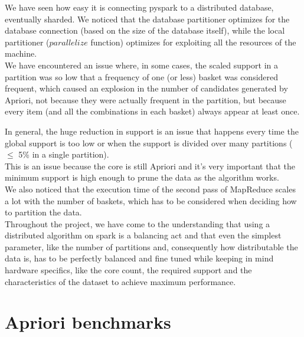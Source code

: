 \documentclass[a4paper]{article}
\begin{document}
	We have seen how easy it is connecting pyspark to a distributed database, eventually sharded.	
	We noticed that the database partitioner optimizes for the database connection (based on the size of the database itself), 
	while the local partitioner ($parallelize$ function) optimizes for exploiting all the resources of the machine.\\
	
	We have encountered an issue where, in some cases, the scaled support in a partition was so low that a frequency of one (or less) basket was considered frequent, 
	which caused an explosion in the number of candidates generated by Apriori, not because they were actually frequent in the partition, but 
	because every item (and all the combinations in each basket) always appear at least once. 

	In general, the huge reduction in support is an issue that happens every time the global support is too low or when the support is divided over many partitions ($\leq$ 5\% in a single partition).\\
	This is an issue because the core is still Apriori and it's very important that the minimum support is high enough to prune the data as the algorithm works.\\

	We also noticed that the execution time of the second pass of MapReduce scales a lot with the number of baskets, which has to be considered when deciding how to partition the data.\\

	Throughout the project, we have come to the understanding that using a distributed algorithm on spark is a balancing act and that even the simplest parameter, like the number of partitions and, consequently how distributable 
	the data is, has to be perfectly balanced and fine tuned while keeping in mind hardware specifics, like the core count, the required support and the characteristics of the dataset to achieve 
	maximum performance.\\

	

	\appendix 

	\section{Apriori benchmarks}
\end{document}
